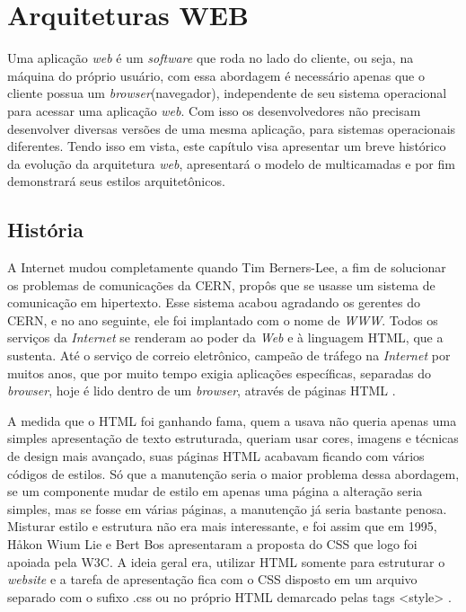 
\chapter{\Large{\textbf{Arquiteturas  WEB}}}
\label{c_cap2}

Uma aplicação \textit{web} é um \textit{software} que roda no lado do cliente, ou seja, na máquina do próprio usuário, com essa abordagem é necessário  apenas que o cliente possua um \textit{browser}(navegador), independente de seu sistema operacional para acessar uma aplicação \textit{web}. Com isso os desenvolvedores não precisam desenvolver diversas versões de uma mesma aplicação, para sistemas operacionais diferentes.
Tendo isso em vista, este capítulo visa apresentar um breve histórico da evolução da arquitetura  \textit{web}, apresentará o modelo de multicamadas e por fim demonstrará seus estilos arquitetônicos.

\section{História}


A Internet mudou completamente quando Tim Berners-Lee, a fim de solucionar os problemas de comunicações da \ac{CERN}, propôs que se usasse um sistema de comunicação em hipertexto. Esse sistema acabou agradando os gerentes do \ac{CERN}, e no ano seguinte, ele foi implantado com o nome de \textit{\ac{WWW}}. Todos os serviços da \textit{Internet} se renderam ao poder da \textit{Web} e à linguagem \ac{HTML}, que a sustenta. Até o serviço de correio eletrônico, campeão de tráfego na \textit{Internet} por muitos anos, que por muito tempo exigia aplicações específicas, separadas do \textit{browser}, hoje é lido dentro de um \textit{browser}, através de páginas \ac{HTML} \cite{rocha99}. 

A medida que o \ac{HTML} foi ganhando fama, quem a usava não queria apenas uma simples apresentação de texto estruturada, queriam usar cores, imagens e técnicas de design mais avançado, suas páginas \ac{HTML} acabavam ficando com vários códigos de estilos. Só que a manutenção seria o maior problema dessa abordagem, se um componente mudar de estilo em apenas uma página a alteração seria simples, mas se fosse em várias páginas, a manutenção já seria bastante penosa. Misturar estilo e estrutura não era mais interessante, e foi assim que em 1995, Håkon Wium Lie e Bert Bos apresentaram a proposta do \ac{CSS} que logo foi apoiada pela \ac{W3C}. A ideia geral era, utilizar \ac{HTML} somente para estruturar o \textit{website} e a tarefa de apresentação fica com o \ac{CSS} disposto em um arquivo separado com o sufixo .css ou no próprio \ac{HTML} demarcado pelas tags <style> \cite{devmediaCSS2018}.

